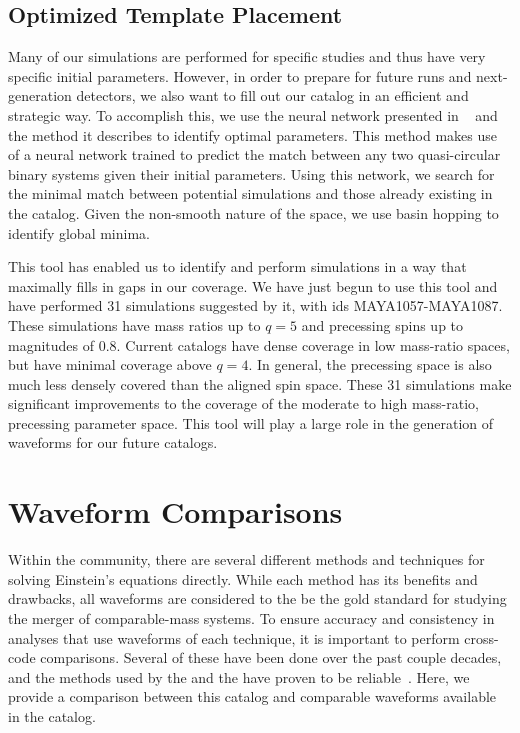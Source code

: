 \documentclass[
twocolumn,prd,
showpacs,
nofootinbib,
amsmath,amssymb,
superscriptaddress]{revtex4-1}
\begin{document}
\subsection{Optimized Template Placement}\label{sec:template_placement}
Many of our simulations are performed for specific studies and thus have very specific initial parameters.
However, in order to prepare for future \lvk{} runs and next-generation detectors, we also want to fill out our catalog in an efficient and strategic way.
To accomplish this, we use the neural network presented in ~\cite{Ferguson:2022qkz} and the method it describes to identify optimal parameters.
This method makes use of a neural network trained to predict the match between any two quasi-circular binary systems given their initial parameters.
Using this network, we search for the minimal match between potential simulations and those already existing in the catalog.
Given the non-smooth nature of the space, we use basin hopping to identify global minima. 

This tool has enabled us to identify and perform simulations in a way that maximally fills in gaps in our coverage. 
We have just begun to use this tool and have performed 31 simulations suggested by it, with ids MAYA1057-MAYA1087.
These simulations have mass ratios up to $q=5$ and precessing spins up to magnitudes of $0.8$.
Current catalogs have dense coverage in low mass-ratio spaces, but have minimal coverage above $q=4$.
In general, the precessing space is also much less densely covered than the aligned spin space.
These 31 simulations make significant improvements to the coverage of the moderate to high mass-ratio, precessing parameter space.
This tool will play a large role in the generation of waveforms for our future catalogs.


\section{Waveform Comparisons}\label{sec:model_comparisons}
Within the \nr{} community, there are several different methods and techniques for solving Einstein's equations directly. 
While each method has its benefits and drawbacks, all \nr{} waveforms are considered to the be the gold standard for studying the merger of comparable-mass \bbh{} systems.
To ensure accuracy and consistency in analyses that use \nr{} waveforms of each technique, it is important to perform cross-code comparisons.
Several of these have been done over the past couple decades, and the methods used by the \etk{} and the \sxs{} have proven to be reliable~\cite{2012CQGra..29l4001A, 2013CQGra..31b5012H, Healy:2017xwx}.
Here, we provide a comparison between this catalog and comparable waveforms available in the \sxs{} catalog. 
\end{document}
